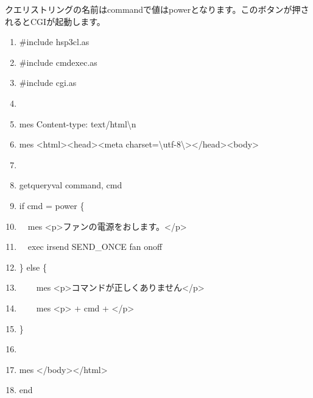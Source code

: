 \documentclass[a4paper,12pt,dvipdfmx]{jarticle}
\begin{document}
クエリストリングの名前はcommandで値はpowerとなります。このボタンが押されるとCGIが起動します。


\bigskip


\bigskip

\bigskip



\centering
\begin{boxedminipage}{16.36cm}
	\begin{enumerate}
	\baselineskip 10pt
	\setlength{\itemsep}{0cm}
	\item\#include {\textquotedbl}hsp3cl.as{\textquotedbl}

	\item\#include {\textquotedbl}cmdexec.as{\textquotedbl}

	\item\#include {\textquotedbl}cgi.as{\textquotedbl}


	\item

	\item mes {\textquotedbl}Content-type: text/html{\textbackslash}n{\textquotedbl}

	\item mes {\textquotedbl}{\textless}html{\textgreater}{\textless}head{\textgreater}{\textless}meta
	 charset={\textbackslash}{\textquotedbl}utf-8{\textbackslash}{\textquotedbl}{\textgreater}{\textless}/head{\textgreater}{\textless}body{\textgreater}{\textquotedbl}


	\item

	\item getqueryval {\textquotedbl}command{\textquotedbl}, cmd

	\item if cmd = {\textquotedbl}power{\textquotedbl} \{

	\item\ \ mes
		{\textquotedbl}{\textless}p{\textgreater}ファンの電源をおします。{\textless}/p{\textgreater}{\textquotedbl}

		\item\ \ exec {\textquotedbl}irsend SEND\_ONCE fan onoff{\textquotedbl}

		\item\} else \{

		\item\ \ \ \ mes
		{\textquotedbl}{\textless}p{\textgreater}コマンドが正しくありません{\textless}/p{\textgreater}{\textquotedbl}

		\item\ \ \ \ mes {\textquotedbl}{\textless}p{\textgreater}{\textquotedbl} + cmd +
	{\textquotedbl}{\textless}/p{\textgreater}{\textquotedbl}

	\item\}


	\item

	\item mes {\textquotedbl}{\textless}/body{\textgreater}{\textless}/html{\textgreater}{\textquotedbl}

	\item end
	\end{enumerate}
\end{boxedminipage}
\flushleft
\end{document}
